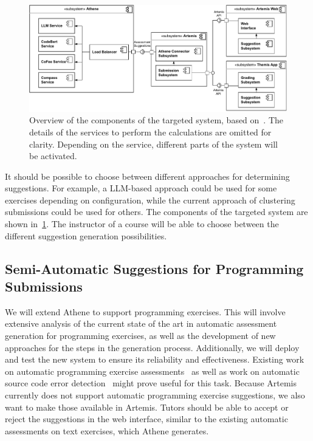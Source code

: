 \begin{figure}[ht]
    \centering
    \includegraphics[width=\linewidth]{figures/proposal/component.pdf}
    \caption{Overview of the components of the targeted system, based on~\cite{atheneLoadBalancer}. The details of the services to perform the calculations are omitted for clarity. Depending on the service, different parts of the system will be activated.}
    \label{fig:component}
\end{figure}
It should be possible to choose between different approaches for determining suggestions. For example, a LLM-based approach could be used for some exercises depending on configuration, while the current approach of clustering submissions could be used for others. The components of the targeted system are shown in~\cref{fig:component}. The instructor of a course will be able to choose between the different suggestion generation possibilities.

\subsection{Semi-Automatic Suggestions for Programming Submissions}
We will extend Athene to support programming exercises. This will involve extensive analysis of the current state of the art in automatic assessment generation for programming exercises, as well as the development of new approaches for the steps in the generation process. Additionally, we will deploy and test the new system to ensure its reliability and effectiveness.
Existing work on automatic programming exercise assessments~\cite{singh2013automated,messer2022grading} as well as work on automatic source code error detection~\cite{sourceCodeAssessment} might prove useful for this task.
%
Because Artemis currently does not support automatic programming exercise suggestions, we also want to make those available in Artemis. Tutors should be able to accept or reject the suggestions in the web interface, similar to the existing automatic assessments on text exercises, which Athene generates. 

